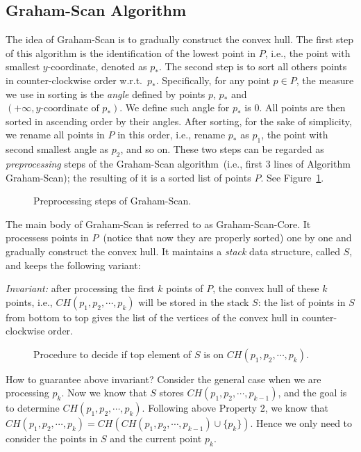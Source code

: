 \subsection*{Graham-Scan Algorithm}

The idea of Graham-Scan is to gradually construct the convex hull.
The first step of this algorithm is the identification of the lowest point in $P$, i.e., the point with smallest $y$-coordinate, denoted as $p_*$.
The second step is to sort all others points in counter-clockwise order w.r.t.\ $p_*$.
Specifically, for any point $p\in P$, the measure we use in sorting is the \emph{angle} defined by points $p$, $p_*$ and $(+\infty, \textrm{$y$-coordinate of $p_*$})$.
We define such angle for $p_*$ is 0. All points are then sorted in ascending order by their angles.
After sorting, for the sake of simplicity, we rename all points in $P$ in this order, i.e., 
rename $p_*$ as $p_1$, the point with second smallest angle as $p_2$, and so on.
These two steps can be regarded as \emph{preprocessing} steps of the Graham-Scan algorithm~(i.e., first 3 lines of Algorithm Graham-Scan);
the resulting of it is a sorted list of points $P$.
See Figure~\ref{fig:sorting}.


\begin{figure}[h!]
\centering{}
\caption{Preprocessing steps of Graham-Scan.}
\label{fig:sorting}
\end{figure}


The main body of Graham-Scan is referred to as Graham-Scan-Core.
It processess points in $P$~(notice that now they are properly sorted) one by one
and gradually construct the convex hull.
It maintains a \emph{stack} data structure, called $S$, and keeps the following variant:

\emph{Invariant:} after processing the first $k$ points of $P$, the convex hull
of these $k$ points, i.e., $CH(p_1, p_2, \cdots, p_k)$ will be stored in the stack $S$: the list of points in $S$
from bottom to top gives the list of the vertices of the convex hull in
counter-clockwise order.

\begin{figure}[b!]
\centering{}
\caption{Procedure to decide if top element of $S$ is on $CH(p_1, p_2, \cdots, p_k)$.}
\label{fig:invariant}
\end{figure}


How to guarantee above invariant? Consider the general case when we are processing $p_k$.
Now we know that $S$ stores $CH(p_1, p_2, \cdots, p_{k-1})$, and the goal is to determine $CH(p_1, p_2, \cdots, p_k)$.
Following above Property 2, we know that $CH(p_1, p_2, \cdots, p_k) = CH(CH(p_1, p_2, \cdots, p_{k-1}) \cup \{p_k\})$.
Hence we only need to consider the points in $S$ and the current point $p_k$.

